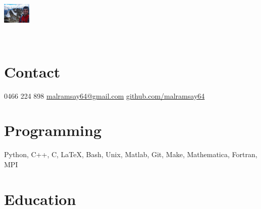 \documentclass{friggeri-cv} %
\begin{document}


\begin{aside} %
    \vspace{30 mm}~
\begin{flushleft}\includegraphics[width=3.6em]{portrait}\\\end{flushleft}~
\section{Contact}
0466 224 898
\href{mailto:malramsay64@gmail.com}{malramsay64@gmail.com}
\href{github.com/malramsay64}{github.com/malramsay64}
\section{Programming}
Python, C++, C, \LaTeX,
Bash, Unix, Matlab, Git, 
Make, Mathematica, 
Fortran, MPI
\end{aside}


\section{Education}
\end{document}
